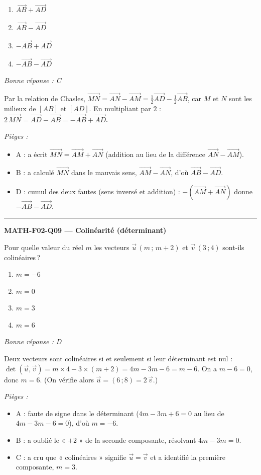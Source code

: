 \documentclass[11pt,a4paper]{article}
\newcommand{\vv}[1]{\vec{#1}}
\begin{document}
\begin{enumerate}[label=\Alph*)]
\item $\vv{AB}+\vv{AD}$
\item $\vv{AB}-\vv{AD}$
\item $-\vv{AB}+\vv{AD}$
\item $-\vv{AB}-\vv{AD}$
\end{enumerate}
\textit{Bonne réponse : C}\par
Par la relation de Chasles, $\vv{MN}=\vv{AN}-\vv{AM}=\tfrac12\vv{AD}-\tfrac12\vv{AB}$, car $M$ et $N$ sont les milieux de $[AB]$ et $[AD]$. En multipliant par $2$ : $2\,\vv{MN}=\vv{AD}-\vv{AB}=-\vv{AB}+\vv{AD}$.\par
\textit{Pièges :}
\begin{itemize}
\item A : a écrit $\vv{MN}=\vv{AM}+\vv{AN}$ (addition au lieu de la différence $\vv{AN}-\vv{AM}$).
\item B : a calculé $\vv{MN}$ dans le mauvais sens, $\vv{AM}-\vv{AN}$, d'où $\vv{AB}-\vv{AD}$.
\item D : cumul des deux fautes (sens inversé et addition) : $-(\vv{AM}+\vv{AN})$ donne $-\vv{AB}-\vv{AD}$.
\end{itemize}
\vspace{8pt}\hrule\vspace{8pt}
\noindent\textbf{MATH-F02-Q09 --- Colinéarité (déterminant)}\par
Pour quelle valeur du réel $m$ les vecteurs $\vv{u}\,(m\,;\,m+2)$ et $\vv{v}\,(3\,;4)$ sont-ils colinéaires\,?
\begin{enumerate}[label=\Alph*)]
\item $m=-6$
\item $m=0$
\item $m=3$
\item $m=6$
\end{enumerate}
\textit{Bonne réponse : D}\par
Deux vecteurs sont colinéaires si et seulement si leur déterminant est nul : $\det(\vv{u},\vv{v})=m\times 4-3\times(m+2)=4m-3m-6=m-6$. On a $m-6=0$, donc $m=6$. (On vérifie alors $\vv{u}=(6\,;8)=2\,\vv{v}$.)\par
\textit{Pièges :}
\begin{itemize}
\item A : faute de signe dans le déterminant ($4m-3m+6=0$ au lieu de $4m-3m-6=0$), d'où $m=-6$.
\item B : a oublié le « $+2$ » de la seconde composante, résolvant $4m-3m=0$.
\item C : a cru que « colinéaires » signifie $\vv{u}=\vv{v}$ et a identifié la première composante, $m=3$.
\end{itemize}
\end{document}
